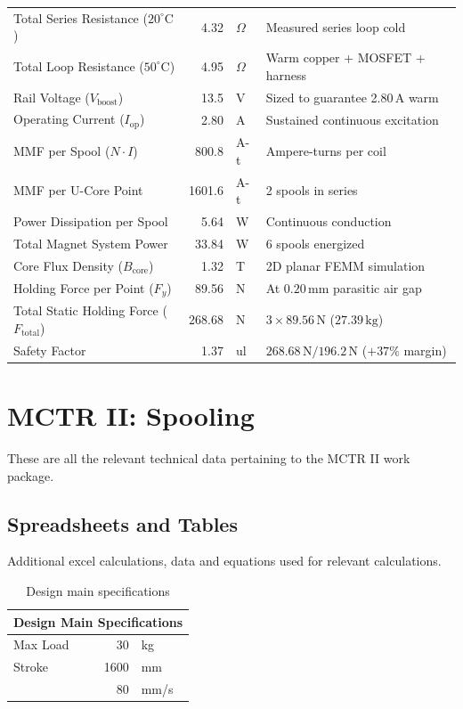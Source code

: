\begin{table}[H]
\begin{tabular}{|l|r|l|l|}
    Total Series Resistance ($20^\circ\text{C}$) & 4.32 & $\Omega$ & Measured series loop cold \\
    Total Loop Resistance ($50^\circ\text{C}$) & 4.95 & $\Omega$ & Warm copper + MOSFET + harness \\
    Rail Voltage ($V_{\mathrm{boost}}$) & 13.5 & V & Sized to guarantee 2.80\,A warm \\
    Operating Current ($I_{\mathrm{op}}$) & 2.80 & A & Sustained continuous excitation \\
    MMF per Spool ($N \cdot I$) & 800.8 & A-t & Ampere-turns per coil \\
    MMF per U-Core Point & 1601.6 & A-t & 2 spools in series \\
    Power Dissipation per Spool & 5.64 & W & Continuous conduction \\
    Total Magnet System Power & 33.84 & W & 6 spools energized \\
    Core Flux Density ($B_{\mathrm{core}}$) & 1.32 & T & 2D planar FEMM simulation \\
    Holding Force per Point ($F_y$) & 89.56 & N & At $0.20\,\text{mm}$ parasitic air gap \\
    Total Static Holding Force ($F_{\mathrm{total}}$) & 268.68 & N & $3 \times 89.56\,\text{N}$ ($27.39\,\text{kg}$) \\
    Safety Factor & 1.37 & ul & $268.68\,\text{N} / 196.2\,\text{N}$ ($+37\%$ margin) \\
    \hline
  \end{tabular}
\end{table}

\section{MCTR II: Spooling}
These are all the relevant technical data pertaining to the MCTR II work package.

\subsection{Spreadsheets and Tables}
Additional excel calculations, data and equations used for relevant calculations.
\begin{table}[H]
  \centering
  \caption{Design main specifications}
  \begin{tabular}{|r|r|l|}
    \hline
    \multicolumn{3}{|c|}{\textbf{Design Main Specifications}} \\
    \hline
    \multicolumn{1}{|l|}{Max Load} & 30 & kg \\
    \multicolumn{1}{|l|}{Stroke} & 1600 & mm \\
    & 80 & mm/s \\
    \hline
  \end{tabular}
  \label{tab:design_main_specs}
\end{table}

